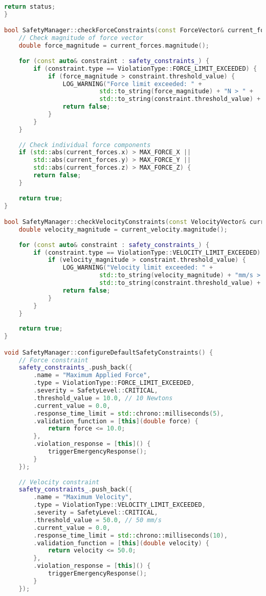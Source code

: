 \begin{lstlisting}[language=C++, caption={Safety Manager Core Implementation}, label={lst:app-safety-manager}]
    return status;
}

bool SafetyManager::checkForceConstraints(const ForceVector& current_forces) {
    // Check magnitude of force vector
    double force_magnitude = current_forces.magnitude();
    
    for (const auto& constraint : safety_constraints_) {
        if (constraint.type == ViolationType::FORCE_LIMIT_EXCEEDED) {
            if (force_magnitude > constraint.threshold_value) {
                LOG_WARNING("Force limit exceeded: " + 
                          std::to_string(force_magnitude) + "N > " + 
                          std::to_string(constraint.threshold_value) + "N");
                return false;
            }
        }
    }
    
    // Check individual force components
    if (std::abs(current_forces.x) > MAX_FORCE_X ||
        std::abs(current_forces.y) > MAX_FORCE_Y ||
        std::abs(current_forces.z) > MAX_FORCE_Z) {
        return false;
    }
    
    return true;
}

bool SafetyManager::checkVelocityConstraints(const VelocityVector& current_velocity) {
    double velocity_magnitude = current_velocity.magnitude();
    
    for (const auto& constraint : safety_constraints_) {
        if (constraint.type == ViolationType::VELOCITY_LIMIT_EXCEEDED) {
            if (velocity_magnitude > constraint.threshold_value) {
                LOG_WARNING("Velocity limit exceeded: " + 
                          std::to_string(velocity_magnitude) + "mm/s > " + 
                          std::to_string(constraint.threshold_value) + "mm/s");
                return false;
            }
        }
    }
    
    return true;
}

void SafetyManager::configureDefaultSafetyConstraints() {
    // Force constraint
    safety_constraints_.push_back({
        .name = "Maximum Applied Force",
        .type = ViolationType::FORCE_LIMIT_EXCEEDED,
        .severity = SafetyLevel::CRITICAL,
        .threshold_value = 10.0, // 10 Newtons
        .current_value = 0.0,
        .response_time_limit = std::chrono::milliseconds(5),
        .validation_function = [this](double force) { 
            return force <= 10.0; 
        },
        .violation_response = [this]() { 
            triggerEmergencyResponse(); 
        }
    });
    
    // Velocity constraint
    safety_constraints_.push_back({
        .name = "Maximum Velocity",
        .type = ViolationType::VELOCITY_LIMIT_EXCEEDED,
        .severity = SafetyLevel::CRITICAL,
        .threshold_value = 50.0, // 50 mm/s
        .current_value = 0.0,
        .response_time_limit = std::chrono::milliseconds(10),
        .validation_function = [this](double velocity) { 
            return velocity <= 50.0; 
        },
        .violation_response = [this]() { 
            triggerEmergencyResponse(); 
        }
    });
    

\end{lstlisting}
